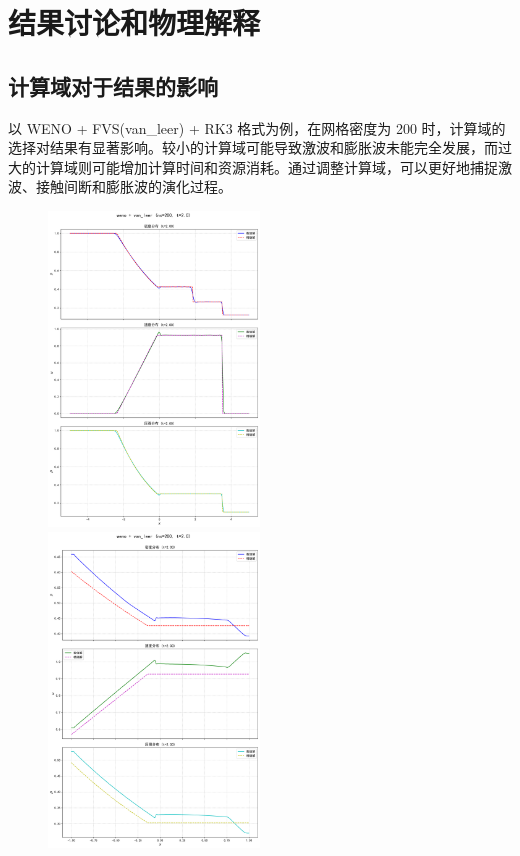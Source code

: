 \documentclass[UTF8]{ctexart}
\begin{document}
\newpage
\section{结果讨论和物理解释}
\subsection{计算域对于结果的影响}
以 WENO + FVS(van\_leer) + RK3 格式为例，在网格密度为 200 时，计算域的选择对结果有显著影响。较小的计算域可能导致激波和膨胀波未能完全发展，而过大的计算域则可能增加计算时间和资源消耗。通过调整计算域，可以更好地捕捉激波、接触间断和膨胀波的演化过程。
\begin{figure}
    \includegraphics[width=0.5\textwidth]{5-2.png}
    \includegraphics[width=0.5\textwidth]{1-2.png}\\

\end{figure}
\end{document}

